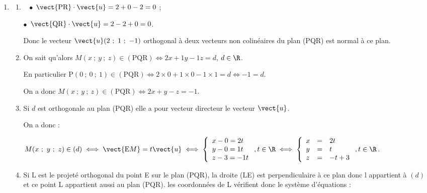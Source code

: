 \begin{enumerate}
Les vecteurs $\vect{\text{PR}}$ et $\vect{\text{QR}}$ ne sont pas colinéaires donc les points P{}, Q et R ne sont pas alignés : les points P{}, Q et R définissent un plan.
\item %
	\begin{enumerate}
		\item ~%
$\bullet~~$$\vect{\text{PR}} \cdot \vect{u} = 2 +  0 - 2 = 0$ ;

$\bullet~~$$\vect{\text{QR}} \cdot \vect{u} = 2 - 2 + 0  = 0$.

Donc le vecteur $\vect{u}(2~;~1~;~- 1)$ orthogonal à deux vecteurs non colinéaires du plan (PQR) est normal à ce plan.
		\item %
On sait qu'alors $M(x~;~y~;~z) \in (\text{PQR}) \iff 2x + 1y - 1z = d$, \: $d \in \R$.

En particulier $\text{P}(0~;~0~;~1) \in (\text{PQR}) \iff 2\times 0  + 1\times 0 - 1 \times 1 = d \iff - 1 = d$.

On a donc $M(x~;~y~;~z) \in (\text{PQR}) \iff 2x + y - z = - 1$.
		\item %
Si $d$ est orthogonale au plan (PQR) elle a pour vecteur directeur le vecteur $\vect{u}$.

On a donc :

$M(x~;~y~;~z) \in (d) \iff \vect{\text{E}M} = t\vect{u}\iff \left\{\begin{array}{l c l}
x - 0 = 2t\\
y - 0= 1t\\
z - 3 = -1t
\end{array}\right., t \in \R \iff \left\{\begin{array}{l c l}
x&=& 2t\\
y&=& t\\
z &=& -t + 3
\end{array}\right., t \in \R$.
		\item %
Si L est le projeté orthogonal du point E sur le plan (PQR), la droite (LE) est perpendiculaire à ce plan donc l appartient à $(d)$ et ce point L appartient aussi au plan (PQR). les coordonnées de L vérifient donc le système d'équations :


\end{enumerate}
\end{enumerate}
